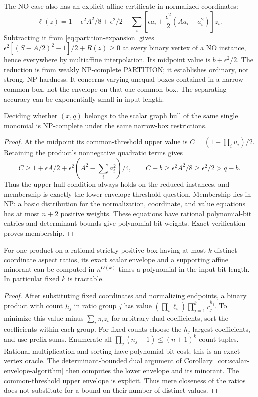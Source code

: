 The NO case also has an explicit affine certificate in normalized
coordinates:
\begin{equation}\label{eq:partition-dual}
 \ell(z)=1-\epsilon^2A^2/8+\epsilon^2/2
    +\sum_i\left[\epsilon a_i+\frac{\epsilon^2}{2}(Aa_i-a_i^2)\right]z_i.
\end{equation}
Subtracting it from \eqref{eq:partition-expansion} gives
$\epsilon^2[(S-A/2)^2-1]/2+R(z)\ge0$ at every binary vertex of a
NO instance, hence everywhere by multiaffine interpolation. Its midpoint
value is $b+\epsilon^2/2$.
The reduction is from weakly NP-complete PARTITION; it establishes
ordinary, not strong, NP-hardness. It concerns varying unequal boxes
contained in a narrow common box, not the envelope on that one common
box. The separating accuracy can be exponentially small in input length.

\begin{corollary}\label{cor:single-product-membership}
Deciding whether $(\bar x,q)$ belongs to the scalar graph hull of the
same single monomial is NP-complete under the same narrow-box restrictions.
\end{corollary}
\begin{proof}
At the midpoint its common-threshold upper value is
$C=(1+\prod_i u_i)/2$. Retaining the product's nonnegative quadratic
terms gives
\[
 C\ge1+\epsilon A/2+\epsilon^2(A^2-\sum_i a_i^2)/4,
 \qquad C-b\ge\epsilon^2A^2/8\ge\epsilon^2/2>q-b.
\]
Thus the upper-hull condition always holds on the reduced instances,
and membership is exactly the lower-envelope threshold question.
Membership lies in NP: a basic distribution for the normalization,
coordinate, and value equations has at most $n+2$ positive weights.
These equations have rational polynomial-bit entries and determinant
bounds give polynomial-bit weights. Exact verification proves membership.
\end{proof}

\begin{proposition}\label{prop:ratio-types}
For one product on a rational strictly positive box having at most $k$
distinct coordinate aspect ratios, its exact scalar envelope and a
supporting affine minorant can be computed in $n^{O(k)}$ times a
polynomial in the input bit length. In particular fixed $k$ is tractable.
\end{proposition}
\begin{proof}
After substituting fixed coordinates and normalizing endpoints, a
binary product with count $h_j$ in ratio group $j$ has value
$(\prod_i\ell_i)\prod_{j=1}^k r_j^{h_j}$. To minimize this value minus
$\sum_i\pi_i z_i$ for arbitrary dual coefficients, sort the coefficients
within each group. For fixed counts choose the $h_j$ largest coefficients,
and use prefix sums. Enumerate all $\prod_j(n_j+1)\le(n+1)^k$ count
tuples. Rational multiplication and sorting have polynomial bit cost;
this is an exact vertex oracle. The determinant-bounded dual argument
of Corollary~\ref{cor:scalar-envelope-algorithm} then computes the lower
envelope and its minorant. The common-threshold upper envelope is
explicit. Thus mere closeness of the ratios does not substitute for a
bound on their number of distinct values.
\end{proof}

